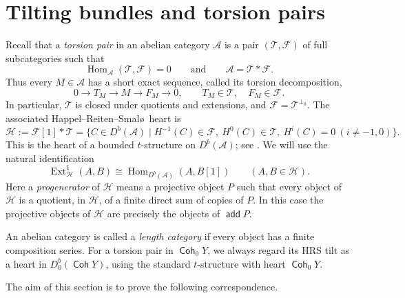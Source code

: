 \documentclass[a4paper,reqno]{amsart}
\def\A{\mathcal{A}}
\def\F{\mathcal{F}}
\def\H{\mathcal{H}}
\def\T{\mathcal{T}}
\DeclareMathOperator{\add}{\mathsf{add}}
\DeclareMathOperator{\Coh}{\mathsf{Coh}}
\DeclareMathOperator{\Hom}{Hom}
\DeclareMathOperator{\Ext}{Ext}
\theoremstyle{definition}
\begin{document}
\section{Tilting bundles and torsion pairs}\label{sec:tilting-torsion}

Recall that a \emph{torsion pair} in an abelian category $\A$ is a pair $(\T,\F)$ of full subcategories such that
\[
\Hom_{\A}(\T,\F)=0
\qquad\text{and}\qquad
\A=\T*\F.
\]
Thus every $M\in\A$ has a short exact sequence, called its torsion decomposition,
\[
0\longrightarrow T_M\longrightarrow M\longrightarrow F_M\longrightarrow0,
\qquad T_M\in\T,\quad F_M\in\F.
\]
In particular, $\T$ is closed under quotients and extensions, and $\F=\T^{\perp_0}$. The associated Happel--Reiten--Smal\o\ heart is
\begin{equation}\label{eq:hrs-heart}
\H:=\F[1]*\T
=\{C\in D^b(\A)\mid H^{-1}(C)\in\F,\ H^0(C)\in\T,\ H^i(C)=0\ (i\ne-1,0)\}.
\end{equation}
This is the heart of a bounded $t$-structure on $D^b(\A)$; see \cite[Example 2.7(2)]{PS20}. We will use the natural identification
\begin{equation}\label{eq:heart-ext-one}
\Ext^1_{\H}(A,B)\cong\Hom_{D^b(\A)}(A,B[1])\qquad(A,B\in\H).
\end{equation}
Here a \emph{progenerator} of $\H$ means a projective object $P$ such that every object of $\H$ is a quotient, in $\H$, of a finite direct sum of copies of $P$. In this case the projective objects of $\H$ are precisely the objects of $\add P$.

An abelian category is called a \emph{length category} if every object has a finite composition series. For a torsion pair in $\Coh_0Y$, we always regard its HRS tilt as a heart in $D^b_0(\Coh Y)$, using the standard $t$-structure with heart $\Coh_0Y$.

The aim of this section is to prove the following correspondence.
\end{document}
